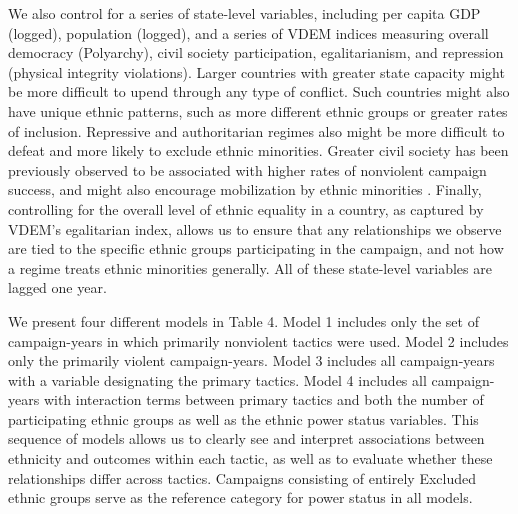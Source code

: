 \documentclass[
  letterpaper,
  DIV=11,
  numbers=noendperiod]{scrartcl}
\begin{document}
We also control for a series of state-level variables, including per
capita GDP (logged), population (logged), and a series of VDEM indices
measuring overall democracy (Polyarchy), civil society participation,
egalitarianism, and repression (physical integrity violations). Larger
countries with greater state capacity might be more difficult to upend
through any type of conflict. Such countries might also have unique
ethnic patterns, such as more different ethnic groups or greater rates
of inclusion. Repressive and authoritarian regimes also might be more
difficult to defeat and more likely to exclude ethnic minorities.
Greater civil society has been previously observed to be associated with
higher rates of nonviolent campaign success, and might also encourage
mobilization by ethnic minorities \autocite{Pinckney2020}. Finally,
controlling for the overall level of ethnic equality in a country, as
captured by VDEM's egalitarian index, allows us to ensure that any
relationships we observe are tied to the specific ethnic groups
participating in the campaign, and not how a regime treats ethnic
minorities generally. All of these state-level variables are lagged one
year.

We present four different models in Table 4. Model 1 includes only the
set of campaign-years in which primarily nonviolent tactics were used.
Model 2 includes only the primarily violent campaign-years. Model 3
includes all campaign-years with a variable designating the primary
tactics. Model 4 includes all campaign-years with interaction terms
between primary tactics and both the number of participating ethnic
groups as well as the ethnic power status variables. This sequence of
models allows us to clearly see and interpret associations between
ethnicity and outcomes within each tactic, as well as to evaluate
whether these relationships differ across tactics. Campaigns consisting
of entirely Excluded ethnic groups serve as the reference category for
power status in all models.
\end{document}
